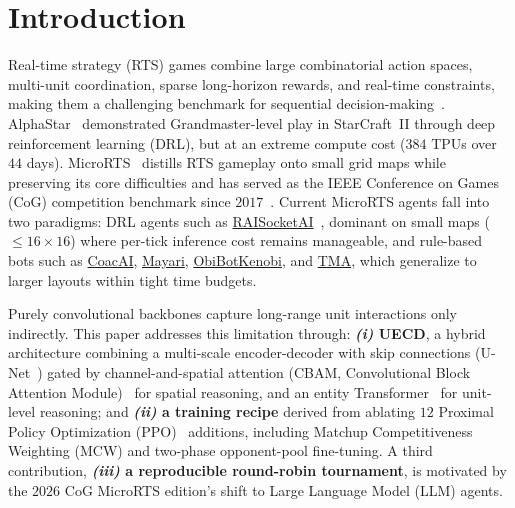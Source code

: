 \documentclass[conference]{IEEEtran}
\newcommand{\code}[1]{{\ttfamily\hyphenchar\font=45\relax #1}}
\newcommand{\urlref}[2]{\href{#1}{\textcolor{link-bot}{#2}}}
\begin{document}
\section{Introduction}

Real-time strategy (RTS) games combine large combinatorial action spaces, multi-unit coordination, sparse long-horizon rewards, and real-time constraints, making them a challenging benchmark for sequential decision-making~\cite{buroRTSChallenge2003, ontanonSurveyRealTimeStrategy2013}. AlphaStar~\cite{vinyalsGrandmasterLevelStarCraft2019} demonstrated Grandmaster-level play in StarCraft~II through deep reinforcement learning (DRL), but at an extreme compute cost ($384$ TPUs over $44$ days). MicroRTS~\cite{ontanonCombinatorialMultiArmedBandit2013} distills RTS gameplay onto small grid maps while preserving its core difficulties and has served as the IEEE Conference on Games (CoG) competition benchmark since $2017$~\cite{ontanonFirstMicroRTSArtificial2018}. Current MicroRTS agents fall into two paradigms: DRL agents such as \urlref{https://github.com/sgoodfriend/rl-algo-impls}{RAISocketAI}~\cite{goodfriendCompetitionWinningDeep2024}, dominant on small maps ($\le\!16{\times}16$) where per-tick inference cost remains manageable, and rule-based bots such as \urlref{https://github.com/Coac/coac-ai-microrts}{CoacAI}, \urlref{https://github.com/barvazkrav/mayariBot}{Mayari}, \urlref{https://github.com/Jannis42/MicroRTSObiBotKenobi}{ObiBotKenobi}, and \urlref{https://github.com/MazzaAlessandro/TMA}{TMA}, which generalize to larger layouts within tight time budgets.

Purely convolutional backbones capture long-range unit interactions only indirectly. This paper addresses this limitation through: \textbf{\emph{(i)} \code{UECD}}, a hybrid architecture combining a multi-scale encoder-decoder with skip connections (U-Net~\cite{ronnebergerUNetConvolutionalNetworks2015}) gated by channel-and-spatial attention (CBAM, Convolutional Block Attention Module)~\cite{wooCBAMConvolutionalBlock2018} for spatial reasoning, and an entity Transformer~\cite{vaswaniAttentionAllYou2017} for unit-level reasoning; and \textbf{\emph{(ii)} a training recipe} derived from ablating $12$ Proximal Policy Optimization (PPO)~\cite{schulmanProximalPolicyOptimization2017} additions, including Matchup Competitiveness Weighting (MCW) and two-phase opponent-pool fine-tuning. A third contribution, \textbf{\emph{(iii)} a reproducible round-robin tournament}, is motivated by the $2026$ CoG MicroRTS edition's shift to Large Language Model (LLM) agents.
\end{document}
